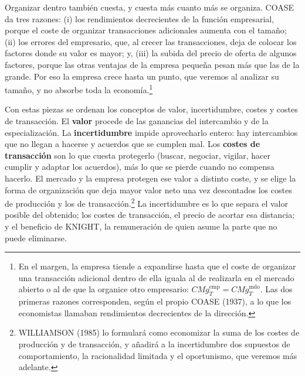 \documentclass[10pt,a4paper]{article}
\begin{document}
Organizar dentro también cuesta, y cuesta más cuanto más se organiza. COASE da tres razones: (i) los rendimientos decrecientes de la función empresarial, porque el coste de organizar transacciones adicionales aumenta con el tamaño; (ii) los errores del empresario, que, al crecer las transacciones, deja de colocar los factores donde su valor es mayor; y, (iii) la subida del precio de oferta de algunos factores, porque las otras ventajas de la empresa pequeña pesan más que las de la grande. Por eso la empresa crece hasta un punto, que veremos al analizar su tamaño, y no absorbe toda la economía.\footnote{%
    En el margen, la empresa tiende a expandirse hasta que el coste de organizar una transacción adicional dentro de ella iguala al de realizarla en el mercado abierto o al de que la organice otro empresario: ${CMg}_T^{\text{emp}} = {CMg}_T^{\text{mdo}}$. Las dos primeras razones corresponden, según el propio COASE (1937), a lo que los economistas llamaban rendimientos decrecientes de la dirección.
}

Con estas piezas se ordenan los conceptos de valor, incertidumbre, costes y costes de transacción. El \textbf{valor} procede de las ganancias del intercambio y de la especialización. La \textbf{incertidumbre} impide aprovecharlo entero: hay intercambios que no llegan a hacerse y acuerdos que se cumplen mal. Los \textbf{costes de transacción} son lo que cuesta protegerlo (buscar, negociar, vigilar, hacer cumplir y adaptar los acuerdos), más lo que se pierde cuando no compensa hacerlo. El mercado y la empresa protegen ese valor a distinto coste, y se elige la forma de organización que deja mayor valor neto una vez descontados los costes de producción y los de transacción.\footnote{%
    WILLIAMSON (1985) lo formulará como economizar la suma de los costes de producción y de transacción, y añadirá a la incertidumbre dos supuestos de comportamiento, la racionalidad limitada y el oportunismo, que veremos más adelante.
} La incertidumbre es lo que separa el valor posible del obtenido; los costes de transacción, el precio de acortar esa distancia; y el beneficio de KNIGHT, la remuneración de quien asume la parte que no puede eliminarse.
\end{document}
